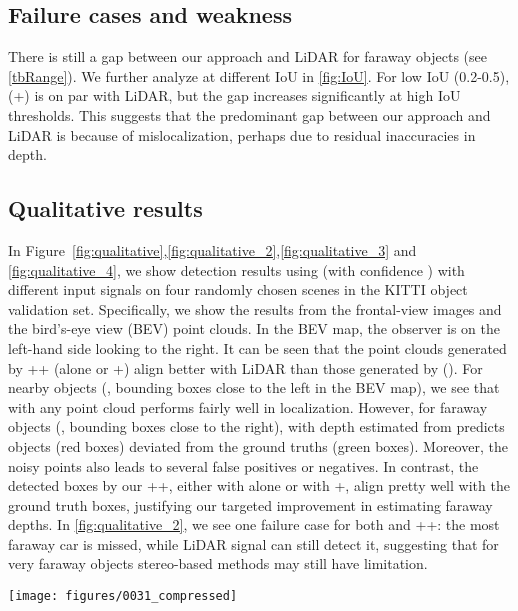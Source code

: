 \subsection{Failure cases and weakness}
There is still a gap between our approach and LiDAR for faraway objects (see \autoref{tbRange}). We further analyze \APBEV at different IoU in \autoref{fig:IoU}. For low IoU (0.2-0.5), \SDN (+\GDC) is on par with LiDAR, but the gap increases significantly at high IoU thresholds.
This suggests that the predominant gap between our approach and LiDAR is because of mislocalization, perhaps due to residual inaccuracies in depth.

\subsection{Qualitative results}
\label{ssec:QR}
In Figure~\ref{fig:qualitative},\ref{fig:qualitative_2},\ref{fig:qualitative_3} and \autoref{fig:qualitative_4}, we show detection results using \PRCNN (with confidence ) with different input signals on four randomly chosen scenes in the KITTI object validation set. Specifically, we show the results from the frontal-view images and the bird's-eye view (BEV) point clouds. In the BEV map, the observer is on the left-hand side looking to the right. It can be seen that the point clouds generated by \PL++ (\SDN alone or \SDN+\GDC) align better with LiDAR than those generated by \PL (\PSMNet).
For nearby objects (\ie, bounding boxes close to the left in the BEV map), we see that \PRCNN with any point cloud performs fairly well in localization. However, for faraway objects (\ie, bounding boxes close to the right), \PL with depth estimated from \PSMNet predicts objects (red boxes) deviated from the ground truths (green boxes). Moreover, the noisy \PSMNet points also leads to several false positives or negatives. In contrast, the detected boxes by our \PL++, either with \SDN alone or with \SDN+\GDC, align pretty well with the ground truth boxes, justifying our targeted improvement in estimating faraway depths. In \autoref{fig:qualitative_2}, we see one failure case for both \PL and \PL++: the most faraway car is missed, while LiDAR signal can still detect it, suggesting that for very faraway objects stereo-based methods may still have limitation.



\begin{figure*}[htb!]
	\centering
	\texttt{[image: figures/0031\_compressed]}
	\caption{\textbf{Qualitative Comparison.} We show the detection results on a KITTI validation scene by \PRCNN with different input point clouds. We visualize them from both frontal-view images and bird's-eye view (BEV) point maps. Ground-truth boxes are in green and predicted bounding boxes are in red. The observer is at the left-hand side of the BEV map looking to the right. In other words, ground truth boxes on the right are more faraway (\ie, deeper) from the observer, and hence hard to localize. Best viewed in color. \label{fig:qualitative_2}}
\end{figure*}

